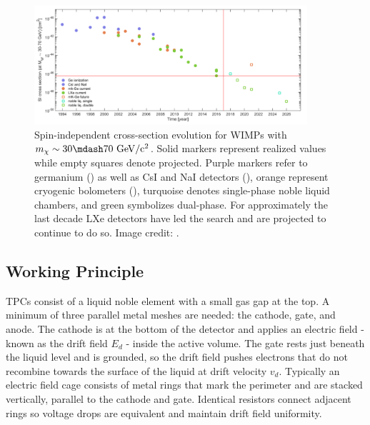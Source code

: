 \begin{figure}
\centering
\includegraphics[width=0.9\textwidth]{SensitivityEvolutionBetter}
\caption[Spin-independent cross-section evolution for WIMPs with $m_{\chi} \sim 30 \mdash 70\ \mathrm{GeV/c^2}$.]{Spin-independent
cross-section evolution for WIMPs with $m_{\chi} \sim 30 \mdash 70\ \mathrm{GeV/c^2}$.  Solid markers represent realized
values while empty squares denote projected.  Purple markers refer to germanium () as well as CsI and NaI
detectors (), orange represent cryogenic bolometers (), turquoise denotes single-phase
noble liquid chambers, and green symbolizes dual-phase.  For approximately the last decade LXe detectors have led the search and are
projected to continue to do so.  Image credit: .}
\label{fig:sensitivity_evo}
\end{figure}

\subsection{Working Principle}
\label{subsec:tpcs_working_principle}
TPCs consist of a liquid noble element with a small gas gap at the top.  A minimum of three parallel metal meshes are needed: the
cathode, gate, and anode.  The cathode is
at the bottom of the detector and applies an electric field - known as the drift field $E_d$ - inside the active volume.  The gate rests
just beneath the liquid level and is grounded, so the drift field pushes electrons that do not recombine towards the surface of the liquid
at drift velocity $v_{d}$.  Typically an electric field cage consists
of metal rings that mark the perimeter and are stacked vertically, parallel to the cathode and gate.  Identical resistors connect adjacent
rings so voltage drops are equivalent and maintain drift field uniformity.

